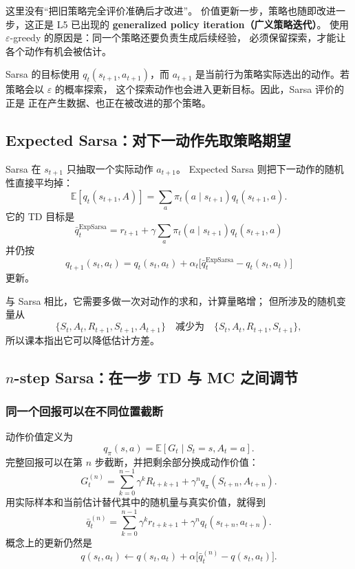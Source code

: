 \documentclass[11pt,a4paper,fontset=fandol]{ctexart}
\newcommand{\E}{\mathbb{E}}
\begin{document}
这里没有“把旧策略完全评价准确后才改进”。
价值更新一步，策略也随即改进一步，这正是 L5 已出现的
\textbf{generalized policy iteration（广义策略迭代）}。
使用 \(\varepsilon\)-greedy 的原因是：同一个策略还要负责生成后续经验，
必须保留探索，才能让各个动作有机会被估计。

\begin{intuitionbox}
Sarsa 的目标使用 \(q_t(s_{t+1},a_{t+1})\)，而 \(a_{t+1}\)
是当前行为策略实际选出的动作。若策略会以 \(\varepsilon\) 的概率探索，
这个探索动作也会进入更新目标。因此，Sarsa 评价的正是
正在产生数据、也正在被改进的那个策略。
\end{intuitionbox}

\subsection{Expected Sarsa：对下一动作先取策略期望}

Sarsa 在 \(s_{t+1}\) 只抽取一个实际动作 \(a_{t+1}\)。
Expected Sarsa 则把下一动作的随机性直接平均掉：
\[
\E[q_t(s_{t+1},A)]
=
\sum_a\pi_t(a\mid s_{t+1})q_t(s_{t+1},a).
\]
它的 TD 目标是
\[
\boxed{
\bar q_t^{\mathrm{ExpSarsa}}
=
r_{t+1}
+\gamma
\sum_a\pi_t(a\mid s_{t+1})q_t(s_{t+1},a)}
\]
并仍按
\[
q_{t+1}(s_t,a_t)
=q_t(s_t,a_t)
+\alpha_t\bigl[
\bar q_t^{\mathrm{ExpSarsa}}-q_t(s_t,a_t)
\bigr]
\]
更新。

与 Sarsa 相比，它需要多做一次对动作的求和，计算量略增；
但所涉及的随机变量从
\[
\{S_t,A_t,R_{t+1},S_{t+1},A_{t+1}\}
\quad\text{减少为}\quad
\{S_t,A_t,R_{t+1},S_{t+1}\},
\]
所以课本指出它可以降低估计方差。

\subsection{\texorpdfstring{\(n\)-step Sarsa}{n-step Sarsa}：在一步 TD 与 MC 之间调节}

\subsubsection{同一个回报可以在不同位置截断}

动作价值定义为
\[
q_\pi(s,a)=\E[G_t\mid S_t=s,A_t=a].
\]
完整回报可以在第 \(n\) 步截断，并把剩余部分换成动作价值：
\[
G_t^{(n)}
=
\sum_{k=0}^{n-1}\gamma^k R_{t+k+1}
+\gamma^n q_\pi(S_{t+n},A_{t+n}).
\]
用实际样本和当前估计替代其中的随机量与真实价值，就得到
\[
\boxed{
\bar q_t^{(n)}
=
\sum_{k=0}^{n-1}\gamma^k r_{t+k+1}
+\gamma^n q_t(s_{t+n},a_{t+n})}.
\]
概念上的更新仍然是
\[
q(s_t,a_t)
\leftarrow
q(s_t,a_t)
+\alpha\bigl[
\bar q_t^{(n)}-q(s_t,a_t)
\bigr].
\]
\end{document}
